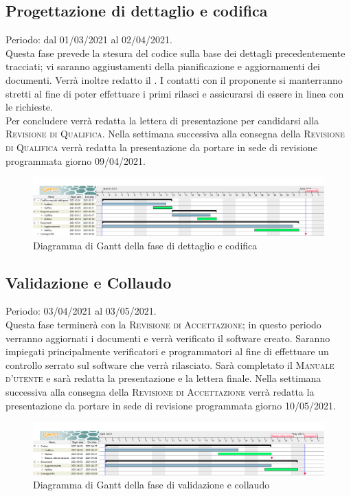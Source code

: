 \documentclass[../piano_di_progetto.tex]{subfiles}
\begin{document}
\subsection{Progettazione di dettaglio e codifica}%
\label{sub:prog_dett}
Periodo: dal 01/03/2021 al 02/04/2021.\\
Questa fase prevede la stesura del codice sulla base dei dettagli precedentemente tracciati; vi saranno aggiustamenti della pianificazione e aggiornamenti dei documenti. Verrà inoltre redatto il \textsc{}. I contatti con il proponente si manterranno stretti al fine di poter effettuare i primi rilasci e assicurarsi di essere in linea con le richieste.\\
Per concludere verrà redatta la lettera di presentazione per candidarsi alla \textsc{Revisione di Qualifica}. Nella settimana successiva alla consegna della \textsc{Revisione di Qualifica} verrà redatta la presentazione da portare in sede di revisione programmata giorno 09/04/2021. 

\begin{figure}[H]
\centering
\includegraphics[width=18cm]{img/03_RQ.png}
\caption{Diagramma di Gantt della fase di dettaglio e codifica}
\end{figure}

\subsection{Validazione e Collaudo}%
\label{sub:valid_coll}
Periodo: 03/04/2021 al 03/05/2021.\\
Questa fase terminerà con la \textsc{Revisione di Accettazione}; in questo periodo verranno aggiornati i documenti e verrà verificato il software creato. Saranno impiegati principalmente verificatori e programmatori al fine di effettuare un controllo serrato sul software che verrà rilasciato. Sarà completato il \textsc{Manuale d'utente} e sarà redatta la presentazione e la lettera finale. Nella settimana successiva alla consegna della \textsc{Revisione di Accettazione} verrà redatta la presentazione da portare in sede di revisione programmata giorno 10/05/2021.

\begin{figure}[H]
\centering
\includegraphics[width=18cm]{img/04_RA.png}
\caption{Diagramma di Gantt della fase di validazione e collaudo}
\end{figure}
\end{document}
